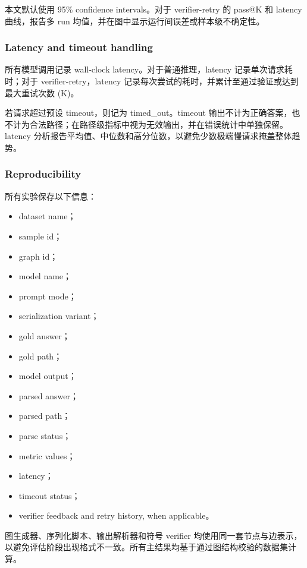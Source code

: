 \documentclass[
  11pt,
]{article}
\begin{document}
本文默认使用 95\% confidence intervals。对于 verifier-retry 的 pass@K 和
latency 曲线，报告多 run 均值，并在图中显示运行间误差或样本级不确定性。

\subsubsection{Latency and timeout
handling}\label{latency-and-timeout-handling}

所有模型调用记录 wall-clock latency。对于普通推理，latency
记录单次请求耗时；对于 verifier-retry，latency
记录每次尝试的耗时，并累计至通过验证或达到最大重试次数 (K)。

若请求超过预设 timeout，则记为 timed\_out。timeout
输出不计为正确答案，也不计为合法路径；在路径级指标中视为无效输出，并在错误统计中单独保留。latency
分析报告平均值、中位数和高分位数，以避免少数极端慢请求掩盖整体趋势。

\subsubsection{Reproducibility}\label{reproducibility}

所有实验保存以下信息：

\begin{itemize}
\item
  dataset name；
\item
  sample id；
\item
  graph id；
\item
  model name；
\item
  prompt mode；
\item
  serialization variant；
\item
  gold answer；
\item
  gold path；
\item
  model output；
\item
  parsed answer；
\item
  parsed path；
\item
  parse status；
\item
  metric values；
\item
  latency；
\item
  timeout status；
\item
  verifier feedback and retry history, when applicable。
\end{itemize}

图生成器、序列化脚本、输出解析器和符号 verifier
均使用同一套节点与边表示，以避免评估阶段出现格式不一致。所有主结果均基于通过图结构校验的数据集计算。
\end{document}
